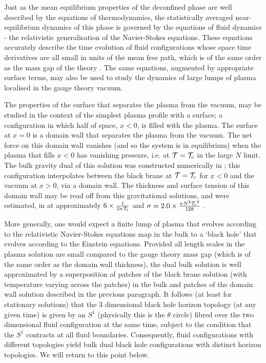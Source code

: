 Just as the mean equilibrium properties of the deconfined phase are
well described by the equations of thermodynamics, the statistically
averaged near-equilibrium dynamics of this phase is governed by the
equations of fluid dynamics - the relativistic generalisation of the
Navier-Stokes equations. These equations accurately describe the
time evolution of fluid configurations whose space time derivatives
are all small in units of the mean free path, which is of the same
order as the mass gap of the theory \cite{Son:2007vk,
Aharony:2005bm}. The same equations, augmented by appropriate
surface terms, may also be used to study the dynamics of large lumps
of plasma localised in the gauge theory vacuum.

The properties of the surface that separates the plasma from the
vacuum, may be studied in the context of the simplest plasma profile
with a surface; a configuration in which half of space, $x<0$, is
filled with the plasma. The surface at $x=0$ is a domain wall that
separates the plasma from the vacuum. The net force on this domain
wall vanishes (and so the system is in equilibrium)  when the plasma
that fills $x<0$ has vanishing pressure, i.e. at $\mathcal{T}=\mathcal{T_\mathrm{c}}$ in the
large $N$ limit. The bulk gravity dual of this solution was
constructed numerically in \cite{Aharony:2005bm}; this configuration
interpolates between the black brane at $\mathcal{T}=\mathcal{T_\mathrm{c}}$ for $x<0$ and
the vacuum at $x>0$, via a domain wall. The thickness and surface
tension of this domain wall may be read off from this gravitational
solutions, and  were estimated, in \cite{Aharony:2005bm} at
approximately $6\times \frac{1}{2\pi \mathcal{T_\mathrm{c}}}$ and $\sigma=2.0 \times
\frac{\pi N^2 \mathcal{T_\mathrm{c}}^2}{128}$ .

More generally, one would expect a finite lump of plasma that
evolves according to the relativistic Navier-Stokes equations map in
the bulk to a `black hole' that evolves according to the Einstein
equations. Provided all length scales in the plasma solution are
small compared to the gauge theory mass gap (which is of the same
order as the domain wall thickness), the dual bulk solution is well
approximated by a superposition of patches of the black brane
solution (with temperature varying across the patches) in the bulk
and patches of the domain wall solution described in the previous
paragraph. It follows (at least for stationary solutions) that the 3
dimensional black hole horizon topology (at any given time) is given
by an $S^1$ (physically this is the $\theta$ circle) fibred over the
two dimensional fluid configuration at the same time, subject to the
condition that the $S^1$ contracts at all fluid boundaries.
Consequently, fluid configurations with different topologies yield
bulk dual black hole configurations with distinct horizon
topologies. We will return to this point below.

